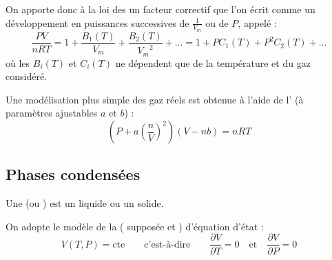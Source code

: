 \begin{definition}
On apporte donc à la loi des  un facteur correctif que l'on écrit comme un développement en puissances successives de $\frac{1}{V_m}$ ou de $P$, appelé  :
\[\frac{PV}{nRT} = 1 + \frac{B_1(T)}{V_m} + \frac{B_2(T)}{{V_m}^2} + \ldots = 1 + P C_1(T) + P^2 C_2(T) + \ldots\]
où les $B_i(T)$ et $C_i(T)$ ne dépendent que de la température et du gaz considéré.
\end{definition}

\begin{definition}
Une modélisation plus simple des gaz réels est obtenue à l'aide de l' (à paramètres ajustables $a$ et $b$) :
\[\left(P + a \left(\frac{n}{V}\right)^2\right)(V - nb) = nRT\]
\end{definition}



\subsection{Phases condensées}

\begin{definition}
Une  (ou ) est un liquide ou un solide.
\end{definition}

\begin{definition}
On adopte le modèle de la  ( supposée  et ) d'équation d'état :
\[V(T, P) = \text{cte} \qquad \text{c'est-à-dire} \qquad \frac{\partial V}{\partial T} = 0 \quad \text{et} \quad \frac{\partial V}{\partial P} = 0\]
\end{definition}